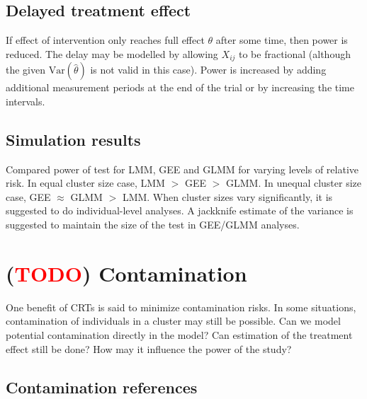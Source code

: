 \documentclass{article}
\newcommand{\Var}{\mathrm{Var}}
\newcommand{\todo}{\textcolor{red}{TODO}}
\begin{document}
\subsection{Delayed treatment effect}

If effect of intervention only reaches full effect $\theta$ after some time, then power is reduced. The delay may be modelled by allowing $X_{ij}$ to be fractional (although the given $\Var(\hat{\theta})$ is not valid in this case). Power is increased by adding additional measurement periods at the end of the trial or by increasing the time intervals.

\subsection{Simulation results}

Compared power of test for LMM, GEE and GLMM for varying levels of relative risk. In equal cluster size case, LMM $>$ GEE $>$ GLMM. In unequal cluster size case, GEE $\approx$ GLMM $>$ LMM. When cluster sizes vary significantly, it is suggested to do individual-level analyses. A jackknife estimate of the variance is suggested to maintain the size of the test in GEE/GLMM analyses.


\newpage


\section{(\todo) Contamination}

One benefit of CRTs is said to minimize contamination risks. In some situations, contamination of individuals in a cluster may still be possible. Can we model potential contamination directly in the model? Can estimation of the treatment effect still be done? How may it influence the power of the study?

\subsection{Contamination references}
\end{document}
